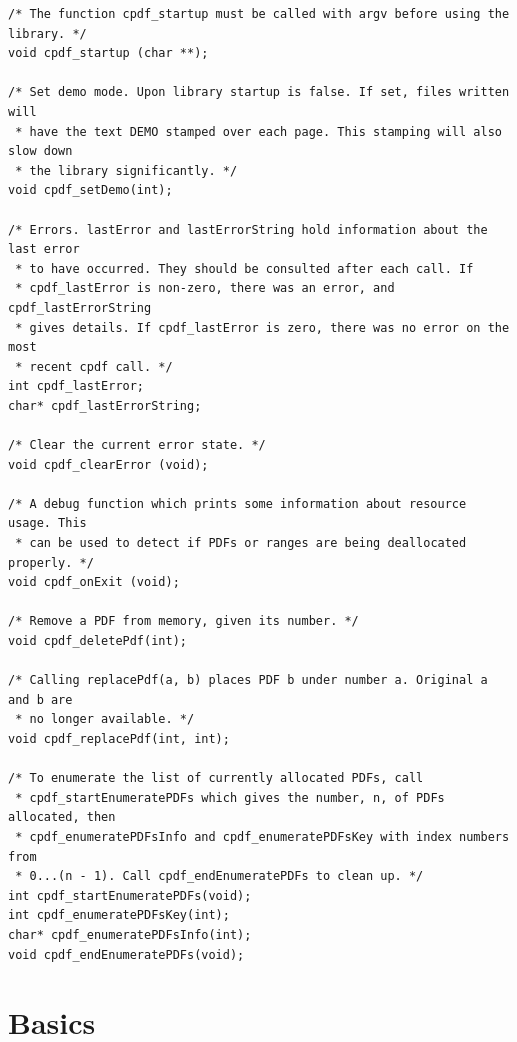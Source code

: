 \documentclass[a4paper]{memoir}
\begin{document}
\begin{small}
\begin{lstlisting}
/* The function cpdf_startup must be called with argv before using the
library. */
void cpdf_startup (char **);

/* Set demo mode. Upon library startup is false. If set, files written will
 * have the text DEMO stamped over each page. This stamping will also slow down
 * the library significantly. */
void cpdf_setDemo(int);

/* Errors. lastError and lastErrorString hold information about the last error
 * to have occurred. They should be consulted after each call. If
 * cpdf_lastError is non-zero, there was an error, and cpdf_lastErrorString
 * gives details. If cpdf_lastError is zero, there was no error on the most
 * recent cpdf call. */
int cpdf_lastError;
char* cpdf_lastErrorString;

/* Clear the current error state. */
void cpdf_clearError (void);

/* A debug function which prints some information about resource usage. This
 * can be used to detect if PDFs or ranges are being deallocated properly. */
void cpdf_onExit (void);

/* Remove a PDF from memory, given its number. */
void cpdf_deletePdf(int);

/* Calling replacePdf(a, b) places PDF b under number a. Original a and b are
 * no longer available. */
void cpdf_replacePdf(int, int);

/* To enumerate the list of currently allocated PDFs, call
 * cpdf_startEnumeratePDFs which gives the number, n, of PDFs allocated, then
 * cpdf_enumeratePDFsInfo and cpdf_enumeratePDFsKey with index numbers from
 * 0...(n - 1). Call cpdf_endEnumeratePDFs to clean up. */
int cpdf_startEnumeratePDFs(void);
int cpdf_enumeratePDFsKey(int);
char* cpdf_enumeratePDFsInfo(int);
void cpdf_endEnumeratePDFs(void);

\end{lstlisting}
\end{small}

\chapter{Basics}
\end{document}
